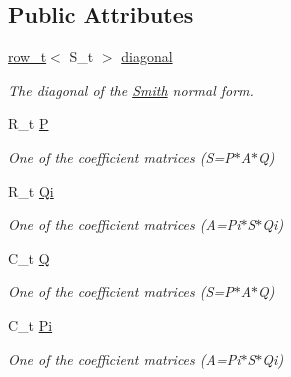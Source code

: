 \subsection*{Public Attributes}
\begin{DoxyCompactItemize}
\item 
\hyperlink{namespaceMackey_a6d37801553e585770ca7d1243ab3b213}{row\+\_\+t}$<$ S\+\_\+t $>$ \hyperlink{classMackey_1_1Smith_a4d7f709505152b53130018e46f9e8411}{diagonal}
\begin{DoxyCompactList}\small\item\em The diagonal of the \hyperlink{classMackey_1_1Smith}{Smith} normal form. \end{DoxyCompactList}\item 
R\+\_\+t \hyperlink{classMackey_1_1Smith_a711a1726ec0da22e9233aa269d66bf73}{P}
\begin{DoxyCompactList}\small\item\em One of the coefficient matrices (S=P$\ast$\+A$\ast$Q) \end{DoxyCompactList}\item 
R\+\_\+t \hyperlink{classMackey_1_1Smith_a8446d6e35feabbdc233e2a15efde4930}{Qi}
\begin{DoxyCompactList}\small\item\em One of the coefficient matrices (A=Pi$\ast$\+S$\ast$\+Qi) \end{DoxyCompactList}\item 
C\+\_\+t \hyperlink{classMackey_1_1Smith_aba53f81430955d8cf7f7ce4677486214}{Q}
\begin{DoxyCompactList}\small\item\em One of the coefficient matrices (S=P$\ast$\+A$\ast$Q) \end{DoxyCompactList}\item 
C\+\_\+t \hyperlink{classMackey_1_1Smith_a890f70fcd15554ee0c3b8469ffb55fde}{Pi}
\begin{DoxyCompactList}\small\item\em One of the coefficient matrices (A=Pi$\ast$\+S$\ast$\+Qi) \end{DoxyCompactList}\end{DoxyCompactItemize}
